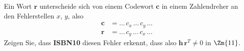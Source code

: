 \begin{aufgabe}[{Klausurvorbereitung 2}]
Ein Wort $\mathbf{r}$ unterscheide sich von einem Codewort $\mathbf{c}$ in einem Zahlendreher an den Fehlerstellen $x$, $y$, also
\begin{align*}
\mathbf{c} &= \dots\, c_x \,\dots\, c_y \,\dots\\
\mathbf{r} &= \dots\, c_y \,\dots\, c_x \,\dots
\end{align*}
Zeigen Sie, dass \textbf{ISBN10} diesen Fehler erkennt, dass also $\mathbf{h}\,\mathbf{r}^T \neq 0$ in $\Zm{11}$.
\end{aufgabe}
